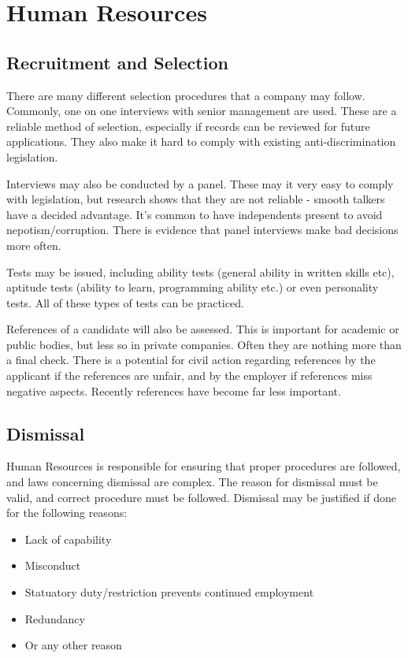 \documentclass{article}
\begin{document}
	
	\section{Human Resources}

	\subsection{Recruitment and Selection}
	There are many different selection procedures that a company may follow. Commonly, one on one interviews with senior management are used. These are a reliable method of selection, especially if records can be reviewed for future applications. They also make it hard to comply with existing anti-discrimination legislation. 
	\par 
	Interviews may also be conducted by a panel. These may it very easy to comply with legislation, but research shows that they are not reliable - smooth talkers have a decided advantage. It's common to have independents present to avoid nepotism/corruption. There is evidence that panel interviews make bad decisions more often.
	
	\par 
	Tests may be issued, including ability tests (general ability in written skills etc), aptitude tests (ability to learn, programming ability etc.) or even personality tests. All of these types of tests can be practiced.		
		
	\par 
	References of a candidate will also be assessed. This is important for academic or public bodies, but less so in private companies. Often they are nothing more than a final check. There is a potential for civil action regarding references by the applicant if the references are unfair, and by the employer if references miss negative aspects. Recently references have become far less important.

	\subsection{Dismissal}
	Human Resources is responsible for ensuring that proper procedures are followed, and laws concerning dismissal are complex. The reason for dismissal must be valid, and correct procedure must be followed. Dismissal may be justified if done for the following reasons:
	\begin{itemize}
	\item Lack of capability
	\item Misconduct
	\item Statuatory duty/restriction prevents continued employment
	\item Redundancy
	\item Or any other reason
	\end{itemize}
	
\end{document}
